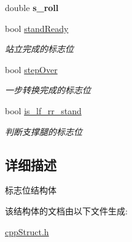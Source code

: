 \begin{DoxyCompactItemize}
\item 
\mbox{\label{structhandle__t_a53d78dacc1f3171b0b9e2794cf7a8419}} 
double {\bfseries s\+\_\+roll}
\item 
\mbox{\label{structhandle__t_a0dc631dba1dda177f48aeb01c7e9570c}} 
bool \hyperlink{structhandle__t_a0dc631dba1dda177f48aeb01c7e9570c}{stand\+Ready}
\begin{DoxyCompactList}\small\item\em 站立完成的标志位 \end{DoxyCompactList}\item 
\mbox{\label{structhandle__t_ad2325b25d45a792fc3270916f2d84e1c}} 
bool \hyperlink{structhandle__t_ad2325b25d45a792fc3270916f2d84e1c}{step\+Over}
\begin{DoxyCompactList}\small\item\em 一步转换完成的标志位 \end{DoxyCompactList}\item 
\mbox{\label{structhandle__t_a2873f23ea50d990fc9cd6b9bcc83c0cb}} 
bool \hyperlink{structhandle__t_a2873f23ea50d990fc9cd6b9bcc83c0cb}{is\+\_\+lf\+\_\+rr\+\_\+stand}
\begin{DoxyCompactList}\small\item\em 判断支撑腿的标志位 \end{DoxyCompactList}\end{DoxyCompactItemize}


\subsection{详细描述}
标志位结构体 

该结构体的文档由以下文件生成\+:\begin{DoxyCompactItemize}
\item 
\hyperlink{cppStruct_8h}{cpp\+Struct.\+h}\end{DoxyCompactItemize}
